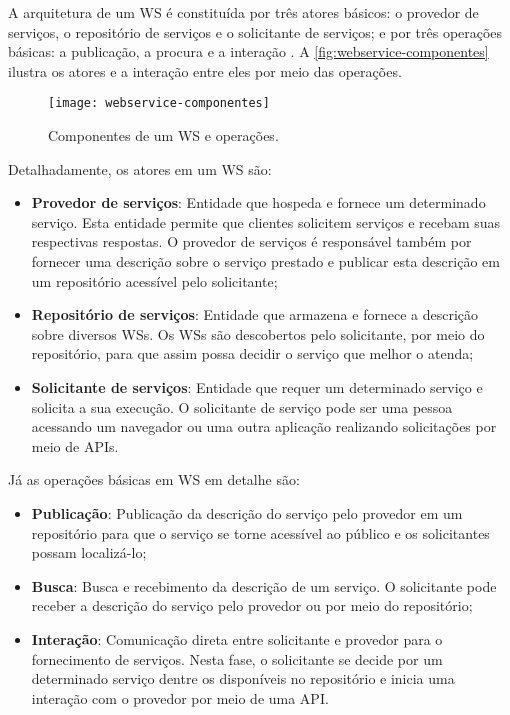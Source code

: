 A arquitetura de um WS é constituída por três atores básicos: o provedor de serviços, o repositório de serviços e o solicitante de serviços; e por três operações básicas: a publicação, a procura e a interação \cite{gottschalk2002webservices}. A \autoref{fig:webservice-componentes} ilustra os atores e a interação entre eles por meio das operações.

\begin{figure}[htb]
	\centering
	\texttt{[image: webservice-componentes]}
	\caption{Componentes de um WS e operações.}
	\label{fig:webservice-componentes}
\end{figure}

Detalhadamente, os atores em um WS são:

\begin{itemize}
	\item \textbf{Provedor de serviços}: Entidade que hospeda e fornece um determinado serviço. Esta entidade permite que clientes solicitem serviços e recebam suas respectivas respostas. O provedor de serviços é responsável também por fornecer uma descrição sobre o serviço prestado e publicar esta descrição em um repositório acessível pelo solicitante;

	\item \textbf{Repositório de serviços}: Entidade que armazena e fornece a descrição sobre diversos WSs. Os WSs são descobertos pelo solicitante, por meio do repositório, para que assim possa decidir o serviço que melhor o atenda;

	\item \textbf{Solicitante de serviços}: Entidade que requer um determinado serviço e solicita a sua execução. O solicitante de serviço pode ser uma pessoa acessando um navegador ou uma outra aplicação realizando solicitações por meio de APIs.
\end{itemize}

Já as operações básicas em WS em detalhe são:

\begin{itemize}
	\item \textbf{Publicação}: Publicação da descrição do serviço pelo provedor em um repositório para que o serviço se torne acessível ao público e os solicitantes possam localizá-lo;

	\item \textbf{Busca}: Busca e recebimento da descrição de um serviço. O solicitante pode receber a descrição do serviço pelo provedor ou por meio do repositório;

	\item \textbf{Interação}: Comunicação direta entre solicitante e provedor para o fornecimento de serviços. Nesta fase, o solicitante se decide por um determinado serviço dentre os disponíveis no repositório e inicia uma interação com o provedor por meio de uma API.
\end{itemize}

